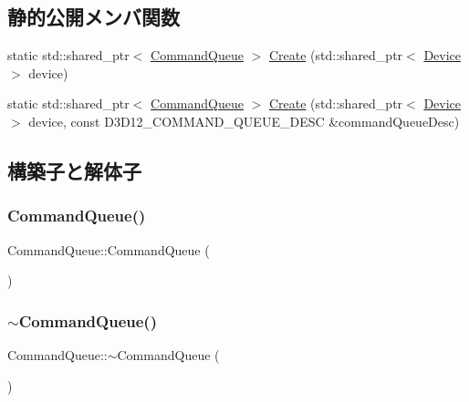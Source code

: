 \subsection*{静的公開メンバ関数}
\begin{DoxyCompactItemize}
\item 
static std\+::shared\+\_\+ptr$<$ \mbox{\hyperlink{class_command_queue}{Command\+Queue}} $>$ \mbox{\hyperlink{class_command_queue_ad8d289f42aa38adfb872d956e678363b}{Create}} (std\+::shared\+\_\+ptr$<$ \mbox{\hyperlink{class_device}{Device}} $>$ device)
\item 
static std\+::shared\+\_\+ptr$<$ \mbox{\hyperlink{class_command_queue}{Command\+Queue}} $>$ \mbox{\hyperlink{class_command_queue_a0498f9a8f823972c11de356a5cdd09cf}{Create}} (std\+::shared\+\_\+ptr$<$ \mbox{\hyperlink{class_device}{Device}} $>$ device, const D3\+D12\+\_\+\+C\+O\+M\+M\+A\+N\+D\+\_\+\+Q\+U\+E\+U\+E\+\_\+\+D\+E\+SC \&command\+Queue\+Desc)
\end{DoxyCompactItemize}


\subsection{構築子と解体子}
\mbox{\label{class_command_queue_a80d86eb1a3b1dd57ea84bde88fd295ee}} 
\subsubsection{\texorpdfstring{Command\+Queue()}{CommandQueue()}}
{\footnotesize\ttfamily Command\+Queue\+::\+Command\+Queue (\begin{DoxyParamCaption}{ }\end{DoxyParamCaption})}

\mbox{\label{class_command_queue_a4575d426ec483ab4778da0650c0556bb}} 
\subsubsection{\texorpdfstring{$\sim$\+Command\+Queue()}{~CommandQueue()}}
{\footnotesize\ttfamily Command\+Queue\+::$\sim$\+Command\+Queue (\begin{DoxyParamCaption}{ }\end{DoxyParamCaption})}



